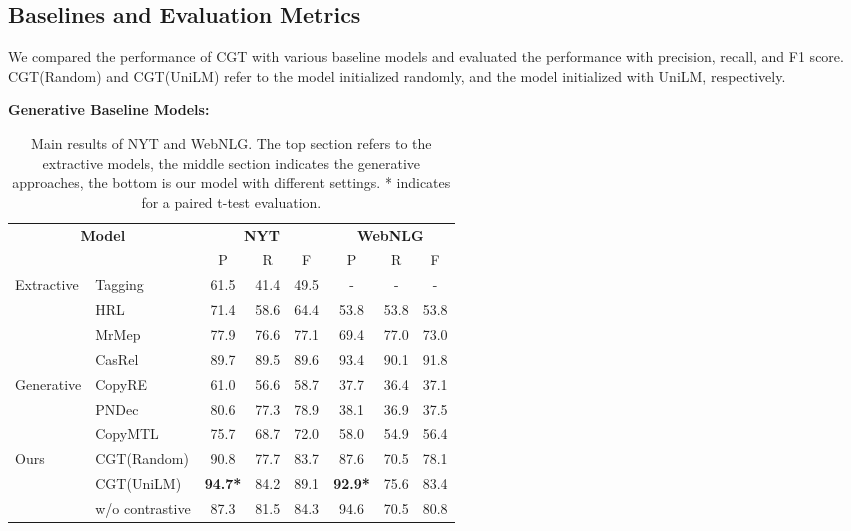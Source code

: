 \documentclass[letterpaper]{article} \usepackage{aaai21}  \usepackage{times}  \usepackage{helvet} \usepackage{courier}  \usepackage[hyphens]{url}  \usepackage{graphicx} \urlstyle{rm} \def\UrlFont{\rm}  \usepackage{natbib}  \usepackage[noend]{algpseudocode}
\begin{document}
\subsection{Baselines and Evaluation Metrics}
We compared the performance of CGT with various baseline models and evaluated the performance with precision, recall, and F1 score. CGT(Random) and CGT(UniLM) refer to the model initialized randomly, and the model initialized with UniLM, respectively.

\textbf{Generative Baseline Models:}

\begin{table*}[h] \centering
\begin{tabular}{ll|ccc|ccc}
 \toprule
 \multicolumn{2}{c|}{\multirow{2}{*}{\textbf{Model}}}& \multicolumn{3}{c|}{\textbf{NYT}} & \multicolumn{3}{c}{\textbf{WebNLG}} \\
\cline{3-8}
&& P & R & F & P & R & F  \\
 \midrule
   \multirow{4}{*}{Extractive}    &  Tagging \cite{DBLP:journals/corr/ZhengWBHZX17}& 61.5 &41.4 &49.5 &- & - &- \\
       & HRL\cite{takanobu2019hierarchical} & 71.4 & 58.6 & 64.4 & 53.8& 53.8 &53.8  \\
      & MrMep \cite{chen2019mrmep} &77.9  &76.6  &77.1  &69.4 &77.0  &73.0  \\
      & CasRel \cite{wei2020novel}  &89.7 &89.5 &89.6 &93.4  &90.1  &91.8  \\
       \midrule
   \multirow{3}{*}{Generative}   &  CopyRE \cite{zeng2018extracting} & 61.0& 56.6& 58.7 &37.7& 36.4& 37.1 \\
       & PNDec \cite{nayak2019effective} & 80.6& 77.3& 78.9 &38.1& 36.9& 37.5 \\
    &    CopyMTL  \cite{zeng2020copymtl}   &75.7  &68.7  &72.0  &58.0 &54.9 &56.4  \\
\midrule
\multirow{3}{*}{Ours}& CGT(Random) & 90.8  & 77.7  & 83.7 &87.6 &70.5  &78.1 \\ 
& CGT(UniLM) & \textbf{94.7*} & 84.2 & 89.1  & \textbf{92.9*}   & 75.6   & 83.4  \\
& w/o contrastive&87.3 &81.5 &84.3 &94.6 &70.5 &80.8\\
 \bottomrule
\end{tabular}
\caption{Main results of NYT and WebNLG. The top section refers to the extractive models, the middle section indicates the generative approaches, the bottom is our model with different settings. * indicates  for a paired t-test evaluation.}
\label{nyt}
\end{table*}
\end{document}
